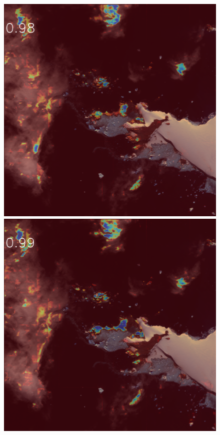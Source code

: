 \documentclass[runningheads]{llncs}
\begin{document}
\begin{figure}[h]
\includegraphics[width=\subFigx]{./fig/datagrow/MSE_single_unet_train_0_3.txt_bias-1_bs128_do0.1e25/orthoQB02_11JAN121245196-M1BS-101001000CD66D00_u08rfAEAC.png}
\includegraphics[width=\subFigx]{./fig/datagrow/MSE_single_unet_train_0_4.txt_bias-1_bs128_do0.1e25/orthoQB02_11JAN121245196-M1BS-101001000CD66D00_u08rfAEAC.png}



\end{figure}
\end{document}
